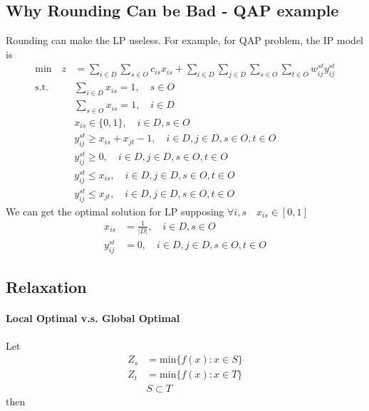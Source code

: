         \subsection{Why Rounding Can be Bad - QAP example}
            Rounding can make the LP useless. For example, for QAP problem, the IP model is
            \begin{align*}
                \text{min} \quad z &= \sum_{i\in D} \sum_{s\in O} c_{is} x_{is} + \sum_{i\in D} \sum_{j \in D} \sum_{s \in O} \sum_{t\in O} w_{ij}^{st}y_{ij}^{st}  \\
                \text{s.t.} \quad & \sum_{i \in D} x_{is} =1, \quad s\in O  \\
                            &\sum_{s \in O} x_{is} = 1, \quad i \in D  \\
                            &x_{is} \in \{0, 1\}, \quad i \in D, s\in O  \\
                            & y_{ij}^{st} \ge x_{is} + x_{jt} - 1, \quad i\in D, j\in D, s\in O, t \in O  \\
                            & y_{ij}^{st} \ge 0, \quad i\in D, j\in D, s\in O, t \in O  \\
                            & y_{ij}^{st} \le x_{is}, \quad i\in D, j\in D, s\in O, t \in O  \\
                            & y_{ij}^{st} \le x_{jt}, \quad i\in D, j\in D, s\in O, t \in O  
            \end{align*}
            We can get the optimal solution for LP supposing $\forall i, s \quad x_{is}\in [0, 1]$
            \begin{align*}
                x_{is} &= \frac{1}{|D|}, \quad i \in D, s\in O   \\
                y_{ij}^{st} & = 0, \quad i\in D, j\in D, s\in O, t \in O 
            \end{align*}
           
        \subsection{Relaxation}

            \paragraph{Local Optimal v.s. Global Optimal}
                Let 
                \begin{align*}
                    Z_s &= \text{min} \{f(x):x\in S\} \\
                    Z_t &= \text{min} \{f(x):x\in T\}  \\
                    & S \subset T 
                \end{align*}
                then

